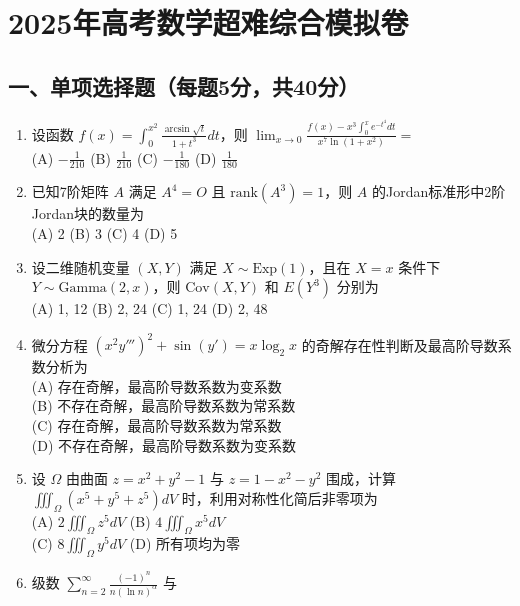 \documentclass[UTF8]{ctexart}
\author{}
\date{}
\begin{document}
\section{2025年高考数学超难综合模拟卷}\label{2025ux5e74ux9ad8ux8003ux6570ux5b66ux8d85ux96beux7efcux5408ux6a21ux62dfux5377}

\subsection{一、单项选择题（每题5分，共40分）}\label{ux4e00ux5355ux9879ux9009ux62e9ux9898ux6bcfux98985ux5206ux517140ux5206uxff09}

\begin{enumerate}
\def\labelenumi{\arabic{enumi}.}
\item
  设函数
  \( f(x) = \int_{0}^{x^2} \frac{\arcsin\sqrt{t}}{1+t^3} dt \)，则
  \( \lim_{x \to 0} \frac{f(x) - x^3 \int_{0}^{x} e^{-t^4} dt}{x^7 \ln(1+x^2)} = \)\\
  (A) \( -\frac{1}{210} \) (B) \( \frac{1}{210} \) (C)
  \( -\frac{1}{180} \) (D) \( \frac{1}{180} \)
\item
  已知7阶矩阵 \( A \) 满足 \( A^4 = O \) 且
  \( \text{rank}(A^3) = 1 \)，则 \( A \)
  的Jordan标准形中2阶Jordan块的数量为\\
  (A) 2 (B) 3 (C) 4 (D) 5
\item
  设二维随机变量 \( (X,Y) \) 满足 \( X \sim \text{Exp}(1) \)，且在
  \( X=x \) 条件下 \( Y \sim \text{Gamma}(2,x) \)，则
  \( \text{Cov}(X,Y) \) 和 \( E(Y^3) \) 分别为\\
  (A) 1, 12 (B) 2, 24 (C) 1, 24 (D) 2, 48
\item
  微分方程 \( (x^2 y''')^2 + \sin(y') = x \log_2 x \)
  的奇解存在性判断及最高阶导数系数分析为\\
  (A) 存在奇解，最高阶导数系数为变系数\\
  (B) 不存在奇解，最高阶导数系数为常系数\\
  (C) 存在奇解，最高阶导数系数为常系数\\
  (D) 不存在奇解，最高阶导数系数为变系数
\item
  设 \( \Omega \) 由曲面 \( z = x^2 + y^2 - 1 \) 与
  \( z = 1 - x^2 - y^2 \) 围成，计算
  \( \iiint_{\Omega} (x^5 + y^5 + z^5) dV \)
  时，利用对称性化简后非零项为\\
  (A) \( 2 \iiint_{\Omega} z^5 dV \) (B)
  \( 4 \iiint_{\Omega} x^5 dV \)\\
  (C) \( 8 \iiint_{\Omega} y^5 dV \) (D) 所有项均为零
\item
  级数 \( \sum_{n=2}^{\infty} \frac{(-1)^n}{n(\ln n)^{\alpha}} \) 与

\end{enumerate}
\end{document}

